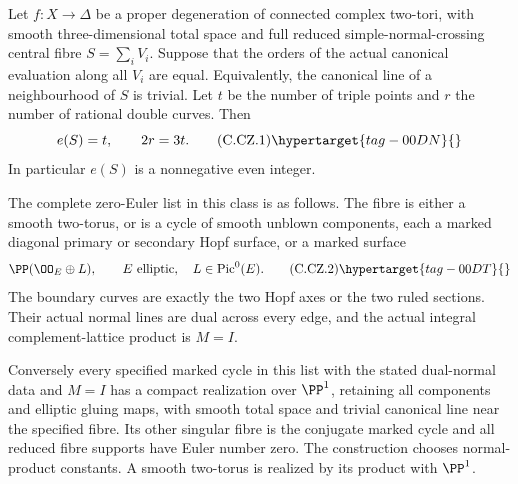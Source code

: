 \begin{proposition}\hypertarget{tag-01EB}{}\label{cdp:st:C.2.UN.65}


Let $f:X\to\Delta$ be a proper degeneration of connected complex
two-tori, with smooth three-dimensional total space and full
reduced simple-normal-crossing central fibre
$S=\sum_iV_i$. Suppose that the orders of the actual canonical
evaluation along all $V_i$ are equal. Equivalently, the canonical
line of a neighbourhood of $S$ is trivial. Let $t$ be the number
of triple points and $r$ the number of rational double curves.
Then
\[
                         e(S)=t,\qquad 2r=3t.
\tag{C.CZ.1}\hypertarget{tag-00DN}{}\label{cdp:eq:C.CZ.1}
\]
In particular $e(S)$ is a nonnegative even integer.

The complete zero-Euler list in this class is as follows.
The fibre is either a smooth two-torus, or is a cycle of smooth
unblown components, each a marked diagonal primary or secondary
Hopf surface, or a marked surface
\[
                   \PP(\OO_E\oplus L),
          \qquad E\text{ elliptic},\quad L\in\operatorname{Pic}^0(E).
\tag{C.CZ.2}\hypertarget{tag-00DT}{}\label{cdp:eq:C.CZ.2}
\]
The boundary curves are exactly the two Hopf axes or the two
ruled sections. Their actual normal lines are dual across
every edge, and the actual integral complement-lattice product
is $M=I$.

Conversely every specified marked cycle in this list with
the stated dual-normal data and $M=I$ has a compact realization
over $\PP^1$, retaining all components and elliptic gluing
maps, with smooth total space and trivial canonical line
near the specified fibre. Its other singular fibre is the
conjugate marked cycle and all reduced fibre supports have
Euler number zero. The construction chooses normal-product
constants. A smooth two-torus is realized by its product
with $\PP^1$.
\end{proposition}
